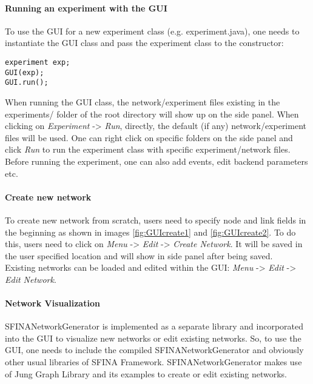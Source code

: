 \documentclass[11pt,fleqn]{book} %
\begin{document}
\paragraph{Running an experiment with the GUI} To use the GUI for a new experiment class (e.g. experiment.java), one needs to instantiate the GUI class and pass the experiment class to the constructor:
\begin{lstlisting}[frame=single] 
experiment exp;
GUI(exp);
GUI.run();
\end{lstlisting}

When running the GUI class, the network/experiment files existing in the experiments/ folder of the root directory will show up on the side panel. When clicking on \textit{Experiment} -> \textit{Run}, directly, the default (if any) network/experiment files will be used. One can right click on specific folders on the side panel and click \textit{Run} to run the experiment class with specific experiment/network files. Before running the experiment, one can also add events, edit backend parameters etc.

\paragraph{Create new network} To create new network from scratch, users need to specify node and link fields in the beginning as shown in images \ref{fig:GUIcreate1} and \ref{fig:GUIcreate2}. To do this, users need to click on \textit{Menu} -> \textit{Edit} -> \textit{Create Network}. It will be saved in the user specified location and will show in side panel after being saved. \\
Existing networks can be loaded and edited within the GUI: \textit{Menu} -> \textit{Edit} -> \textit{Edit Network}.

\paragraph{Network Visualization} SFINANetworkGenerator is implemented as a separate library and incorporated into the GUI to visualize new networks or edit existing networks. So, to use the GUI, one needs to include the compiled SFINANetworkGenerator and obviously other usual libraries of SFINA Framework. SFINANetworkGenerator makes use of Jung Graph Library and its examples to create or edit existing networks.
\end{document}
